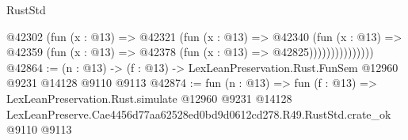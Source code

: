 \begin{lexlean}{RustStd}
\begin{coremodule}
                      @42302
                        (fun (x : @13) =>
                        @42321
                          (fun (x : @13) =>
                          @42340
                            (fun (x : @13) =>
                            @42359 (fun (x : @13) => @42378 (fun (x : @13) => @42825)))))))))))))))
@42864 := (n : @13) -> (f : @13) -> LexLeanPreservation.Rust.FunSem @12960 @9231 @14128 @9110 @9113
@42874 := fun (n : @13) =>
  fun (f : @13) =>
  LexLeanPreservation.Rust.simulate
    @12960
    @9231
    @14128
    LexLeanPreserve.Cae4456d77aa62528ed0bd9d0612cd278.R49.RustStd.crate_ok
    @9110
    @9113
\end{coremodule}
\end{lexlean}

